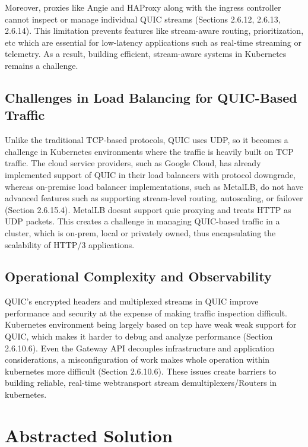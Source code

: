 Moreover, proxies like Angie and HAProxy along with the ingress controller cannot inspect or manage individual QUIC streams (Sections 2.6.12, 2.6.13, 2.6.14). This limitation prevents features like stream-aware routing, prioritization, etc which are essential for low-latency applications such as real-time streaming or telemetry. As a result, building efficient, stream-aware systems in Kubernetes remains a challenge.

\subsection{Challenges in Load Balancing for QUIC-Based Traffic}
Unlike the traditional TCP-based protocols, QUIC uses UDP, so it becomes a challenge in Kubernetes environments where the traffic is heavily built on TCP traffic. The cloud service providers, such as Google Cloud, has already implemented support of QUIC in their load balancers with protocol downgrade, whereas on-premise load balancer implementations, such as MetalLB, do not have advanced features such as supporting stream-level routing, autoscaling, or failover (Section 2.6.15.4). MetalLB doesnt support quic proxying and treats HTTP as UDP packets. This creates a challenge in managing QUIC-based traffic in a cluster, which is on-prem, local or privately owned, thus encapsulating the scalability of HTTP/3 applications.


\subsection{Operational Complexity and Observability}

QUIC’s encrypted headers and multiplexed streams in QUIC improve performance and security at the expense of making traffic inspection difficult. Kubernetes environment being largely based on tcp have weak weak support for QUIC, which makes it harder to debug and analyze performance (Section 2.6.10.6). Even the Gateway API decouples infrastructure and application considerations, a misconfiguration of work makes whole operation within kubernetes more difficult (Section 2.6.10.6). These issues create barriers to building reliable, real-time webtransport stream demultiplexers/Routers in kubernetes.

\section{Abstracted Solution}


